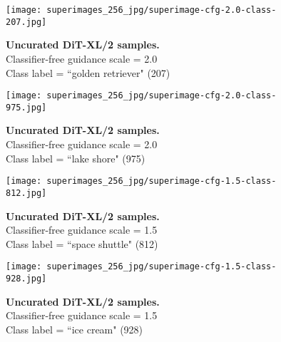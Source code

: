 \documentclass[10pt,twocolumn,letterpaper]{article}
\begin{document}
\clearpage
\pagestyle{fancy}
\fancyhead{}

\begin{figure}\centering
\texttt{[image: superimages\_256\_jpg/superimage-cfg-2.0-class-207.jpg]}
\caption{\textbf{Uncurated  DiT-XL/2 samples.} \\Classifier-free guidance scale = 2.0\\Class label = ``golden retriever" (207)}\vspace{-2mm}
\label{fig:samples5}
\end{figure}

\begin{figure}\centering
\texttt{[image: superimages\_256\_jpg/superimage-cfg-2.0-class-975.jpg]}
\caption{\textbf{Uncurated  DiT-XL/2 samples.} \\Classifier-free guidance scale = 2.0\\Class label = ``lake shore" (975)}\vspace{-2mm}
\label{fig:samples6}
\end{figure}

\clearpage
\pagestyle{fancy}
\fancyhead{}

\begin{figure}\centering
\texttt{[image: superimages\_256\_jpg/superimage-cfg-1.5-class-812.jpg]}
\caption{\textbf{Uncurated  DiT-XL/2 samples.} \\Classifier-free guidance scale = 1.5\\Class label = ``space shuttle" (812)}\vspace{-2mm}
\label{fig:samples7}
\end{figure}

\begin{figure}\centering
\texttt{[image: superimages\_256\_jpg/superimage-cfg-1.5-class-928.jpg]}
\caption{\textbf{Uncurated  DiT-XL/2 samples.} \\Classifier-free guidance scale = 1.5\\Class label = ``ice cream" (928)}\vspace{-2mm}
\label{fig:samples8}
\end{figure}
\end{document}
